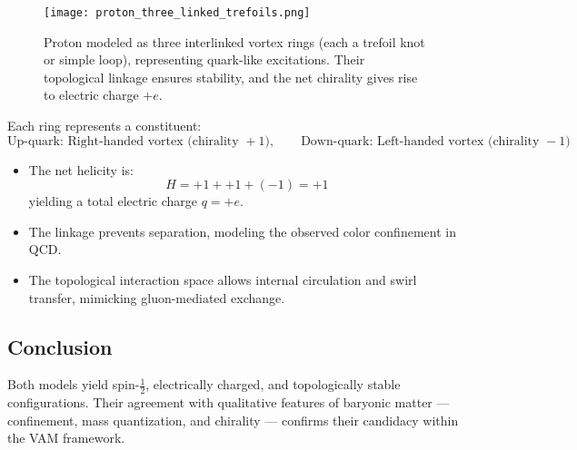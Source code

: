 \begin{figure}[H]
    \centering
    \texttt{[image: proton\_three\_linked\_trefoils.png]}
    \caption{Proton modeled as three interlinked vortex rings (each a trefoil knot or simple loop), representing quark-like excitations. Their topological linkage ensures stability, and the net chirality gives rise to electric charge \(+e\).}
\end{figure}

\noindent
Each ring represents a constituent:
\[
\text{Up-quark: } \text{Right-handed vortex (chirality } +1), \qquad
\text{Down-quark: } \text{Left-handed vortex (chirality } -1)
\]

\begin{itemize}
    \item The net helicity is:
    \[
    H = +1 + +1 + (-1) = +1
    \]
    yielding a total electric charge \(q = +e\).
    \item The linkage prevents separation, modeling the observed color confinement in QCD.
    \item The topological interaction space allows internal circulation and swirl transfer, mimicking gluon-mediated exchange.
\end{itemize}

\subsection{Conclusion}

Both models yield spin-\(\tfrac{1}{2}\), electrically charged, and topologically stable configurations. Their agreement with qualitative features of baryonic matter — confinement, mass quantization, and chirality — confirms their candidacy within the VAM framework.

